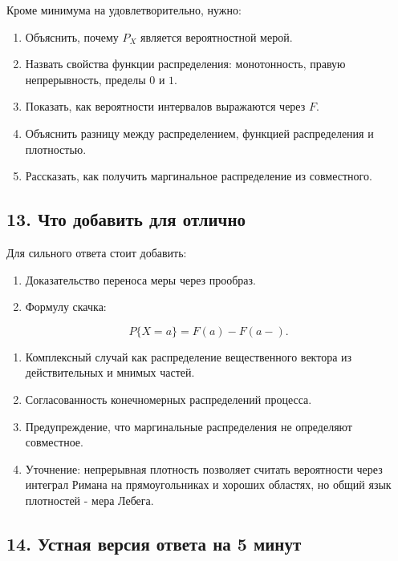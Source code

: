 \documentclass[
  11pt,
  a4paper,
]{article}
\providecommand{\tightlist}{%
  \setlength{\itemsep}{0pt}\setlength{\parskip}{0pt}}
\begin{document}
Кроме минимума на удовлетворительно, нужно:

\begin{enumerate}
\def\labelenumi{\arabic{enumi}.}
\tightlist
\item
  Объяснить, почему \(P_X\) является вероятностной мерой.
\item
  Назвать свойства функции распределения: монотонность, правую
  непрерывность, пределы \(0\) и \(1\).
\item
  Показать, как вероятности интервалов выражаются через \(F\).
\item
  Объяснить разницу между распределением, функцией распределения и
  плотностью.
\item
  Рассказать, как получить маргинальное распределение из совместного.
\end{enumerate}

\subsection{13. Что добавить для
отлично}\label{ux447ux442ux43e-ux434ux43eux431ux430ux432ux438ux442ux44c-ux434ux43bux44f-ux43eux442ux43bux438ux447ux43dux43e}

Для сильного ответа стоит добавить:

\begin{enumerate}
\def\labelenumi{\arabic{enumi}.}
\tightlist
\item
  Доказательство переноса меры через прообраз.
\item
  Формулу скачка:
\end{enumerate}

\[
P\{X=a\}=F(a)-F(a-).
\]

\begin{enumerate}
\def\labelenumi{\arabic{enumi}.}
\setcounter{enumi}{2}
\tightlist
\item
  Комплексный случай как распределение вещественного вектора из
  действительных и мнимых частей.
\item
  Согласованность конечномерных распределений процесса.
\item
  Предупреждение, что маргинальные распределения не определяют
  совместное.
\item
  Уточнение: непрерывная плотность позволяет считать вероятности через
  интеграл Римана на прямоугольниках и хороших областях, но общий язык
  плотностей - мера Лебега.
\end{enumerate}

\subsection{14. Устная версия ответа на 5
минут}\label{ux443ux441ux442ux43dux430ux44f-ux432ux435ux440ux441ux438ux44f-ux43eux442ux432ux435ux442ux430-ux43dux430-5-ux43cux438ux43dux443ux442}
\end{document}
